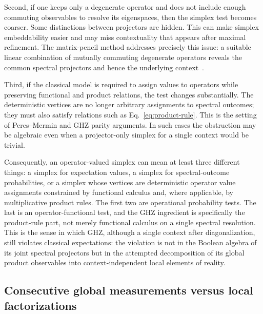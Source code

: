 \documentclass[aps,pra,twocolumn,superscriptaddress,nofootinbib]{revtex4-2}
\begin{document}
Second, if one keeps only a degenerate operator and does not include enough commuting observables to resolve its eigenspaces, then the simplex test becomes coarser.  Some distinctions between projectors are hidden.  This can make simplex embeddability easier and may miss contextuality that appears after maximal refinement.  The matrix-pencil method addresses precisely this issue: a suitable linear combination of mutually commuting degenerate operators reveals the common spectral projectors and hence the underlying context~\cite{svozil-2024-convert-pra-externalfigures}.

Third, if the classical model is required to assign values to operators while preserving functional and product relations, the test changes substantially.  The deterministic vertices are no longer arbitrary assignments to spectral outcomes; they must also satisfy relations such as Eq.~\eqref{eq:product-rule}.  This is the setting of Peres--Mermin and GHZ parity arguments.  In such cases the obstruction may be algebraic even when a projector-only simplex for a single context would be trivial.

Consequently, an operator-valued simplex can mean at least three different things: a simplex for expectation values, a simplex for spectral-outcome probabilities, or a simplex whose vertices are deterministic operator value assignments constrained by functional calculus and, where applicable, by multiplicative product rules.  The first two are operational probability tests.  The last is an operator-functional test, and the GHZ ingredient is specifically the product-rule part, not merely functional calculus on a single spectral resolution.  This is the sense in which GHZ, although a single context after diagonalization, still violates classical expectations: the violation is not in the Boolean algebra of its joint spectral projectors but in the attempted decomposition of its global product observables into context-independent local elements of reality.


\subsection{Consecutive global measurements versus local factorizations}
\label{subsec:ghz-consecutive}
\end{document}
